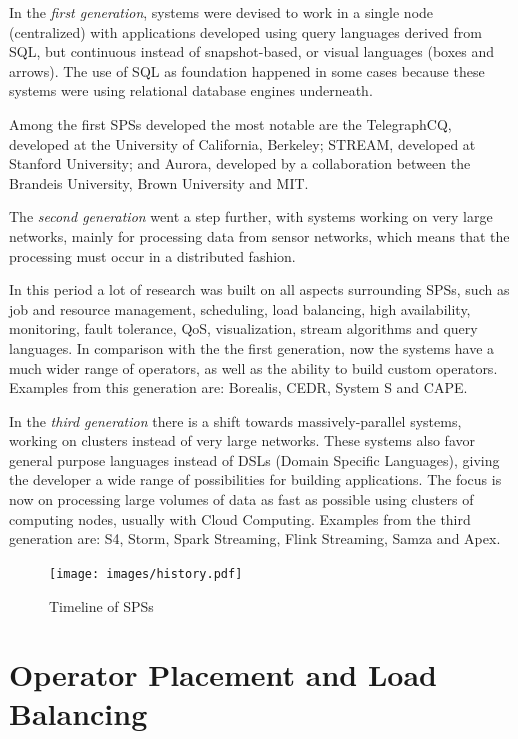 \documentclass[ppgc,diss,english]{iiufrgs}
\begin{document}
In the \emph{first generation}, systems were devised to work in a single node (centralized) with applications developed using query languages derived from SQL, but continuous instead of snapshot-based, or visual languages (boxes and arrows). The use of SQL as foundation happened in some cases because these systems were using relational database engines underneath.

Among the first SPSs developed the most notable are the TelegraphCQ, developed at the University of California, Berkeley; STREAM, developed at Stanford University; and Aurora, developed by a collaboration between the Brandeis University, Brown University and MIT.

The \emph{second generation} went a step further, with systems working on very large networks, mainly for processing data from sensor networks, which means that the processing must occur in a distributed fashion.

In this period a lot of research was built on all aspects surrounding SPSs, such as job and resource management, scheduling, load balancing, high availability, monitoring, fault tolerance, QoS, visualization, stream algorithms and query languages. In comparison with the the first generation, now the systems have a much wider range of operators, as well as the ability to build custom operators. Examples from this generation are: Borealis, CEDR, System S and CAPE.

In the \emph{third generation} there is a shift towards massively-parallel systems, working on clusters instead of very large networks. These systems also favor general purpose languages instead of DSLs (Domain Specific Languages), giving the developer a wide range of possibilities for building applications. The focus is now on processing large volumes of data as fast as possible using clusters of computing nodes, usually with Cloud Computing. Examples from the third generation are: S4, Storm, Spark Streaming, Flink Streaming, Samza and Apex.

\begin{figure}[!ht]
	\centering
	\texttt{[image: images/history.pdf]}
	\caption[Timeline of SPSs]{Timeline of SPSs \cite{heinze2014cloud}\cite{paulvincent2014}}
	\label{fig:sps_history}
\end{figure}


\section{Operator Placement and Load Balancing}
\label{sec:esp:scheduling_load_balancing}
\end{document}
